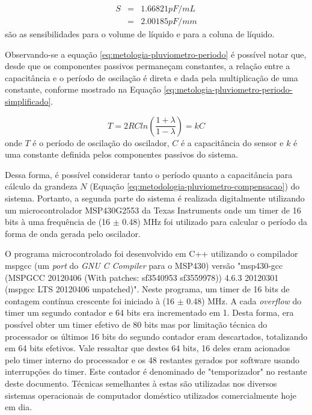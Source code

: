 \documentclass[a4paper]{instrumentacao}
\begin{document}
\begin{eqnarray}
	S &=& 1.66821 pF/mL \\
	  &=& 2.00185 pF/mm \nonumber
	\label{eq:metodologia-pluviometro-teorico-capacitancia-sensibilidade}
\end{eqnarray}
\noindent são as sensibilidades para o volume de líquido e para a coluna de líquido.

Observando-se a equação \ref{eq:metologia-pluviometro-periodo} é possível notar que, desde que os componentes passivos permaneçam constantes, a relação entre a capacitância e o período de oscilação é direta e dada pela multiplicação de uma constante, conforme mostrado na Equação \ref{eq:metologia-pluviometro-periodo-simplificado}.

\begin{equation}
	T = 2 R C ln \left(\frac{1+\lambda}{1-\lambda}\right) = k C
	\label{eq:metologia-pluviometro-periodo-simplificado}
\end{equation}
\noindent onde $T$ é o período de oscilação do oscilador, $C$ é a capacitância do sensor e $k$ é uma constante definida pelos componentes passivos do sistema.

Dessa forma, é possível considerar tanto o período quanto a capacitância para cálculo da grandeza $N$ (Equação \ref{eq:metodologia-pluviometro-compensacao}) do sistema. Portanto, a segunda parte do sistema é realizada digitalmente utilizando um microcontrolador MSP430G2553 da Texas Instruments onde um timer de 16 bits à uma frequência de (16 $\pm$ 0.48) MHz foi utilizado para calcular o período da forma de onda gerada pelo oscilador.

O programa microcontrolado foi desenvolvido em C++ utilizando o compilador mspgcc (um \textit{port} do \textit{GNU C Compiler} para o MSP430) versão "msp430-gcc (MSPGCC 20120406 (With patches: sf3540953 sf3559978)) 4.6.3 20120301 (mspgcc LTS 20120406 unpatched)". Neste programa, um timer de 16 bits de contagem contínua crescente foi iniciado à (16 $\pm$ 0.48) MHz. A cada \textit{overflow} do timer um segundo contador e 64 bits era incrementado em 1. Desta forma, era possível obter um timer efetivo de 80 bits mas por limitação técnica do processador os últimos 16 bits do segundo contador eram descartados, totalizando em 64 bits efetivos. Vale ressaltar que destes 64 bits, 16 deles eram acionados pelo timer interno do processador e os 48 restantes gerados por software usando interrupções do timer. Este contador é denominado de "temporizador" no restante deste documento. Técnicas semelhantes à estas são utilizadas nos diversos sistemas operacionais de computador doméstico utilizados comercialmente hoje em dia.
\end{document}
